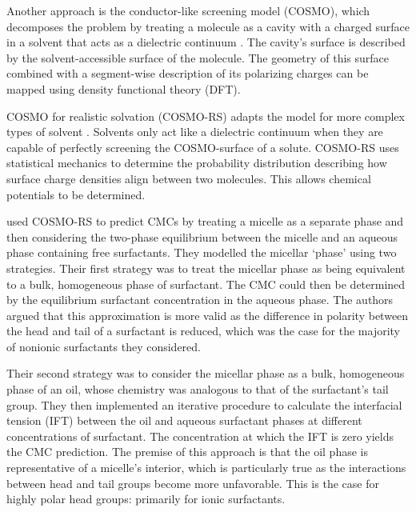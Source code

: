 
Another approach is the conductor-like screening model (COSMO), which decomposes
the problem by treating a molecule as a cavity with a charged surface in a
solvent that acts as a dielectric continuum \cite{klamtCOSMONewApproach1993}.
The cavity's surface is described by the solvent-accessible surface of the
molecule. The geometry of this surface combined with a segment-wise description
of its polarizing charges can be mapped using density functional theory (DFT).

COSMO for realistic solvation (COSMO-RS) adapts the model for more complex types
of solvent \cite{klamtCOSMORSAlternativeSimulation2010}. Solvents only act like
a dielectric continuum when they are capable of perfectly screening the
COSMO-surface of a solute. COSMO-RS uses statistical mechanics to determine the
probability distribution describing how surface charge densities align between
two molecules. This allows chemical potentials to be determined.

\citet{turchiFirstprinciplesPredictionCritical2022} used COSMO-RS to predict
CMCs by treating a micelle as a separate phase and then considering the
two-phase equilibrium between the micelle and an aqueous phase containing free
surfactants. They modelled the micellar `phase' using two strategies. Their
first strategy was to treat the micellar phase as being equivalent to a bulk,
homogeneous phase of surfactant. The CMC could then be determined by the
equilibrium surfactant concentration in the aqueous phase. The authors argued
that this approximation is more valid as the difference in polarity between the
head and tail of a surfactant is reduced, which was the case for the majority of
nonionic surfactants they considered.

Their second strategy was to consider the micellar phase as a bulk, homogeneous
phase of an oil, whose chemistry was analogous to that of the surfactant's tail
group. They then implemented an iterative procedure to calculate the interfacial
tension (IFT) between the oil and aqueous surfactant phases at different
concentrations of surfactant. The concentration at which the IFT is zero yields
the CMC prediction. The premise of this approach is that the oil phase is
representative of a micelle's interior, which is particularly true as the
interactions between head and tail groups become more unfavorable. This is the
case for highly polar head groups: primarily for ionic surfactants.

